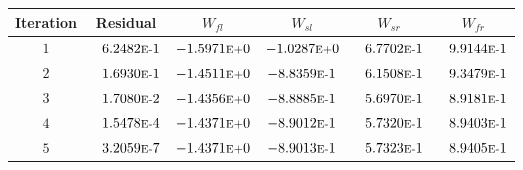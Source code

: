 \begin{tabular*}{\textwidth}{@{\extracolsep{\fill}} cccccc}
\\ 
\hline 
\hline 
Iteration & Residual & $W_{fl}$ & $W_{sl}$ & $W_{sr}$ & $W_{fr}$ \\ 
\hline 
$1$ & $\phantom{-} 6.2482\mbox{\sc{e}\smaller{-}}1$ & $-1.5971\mbox{\sc{e}\smaller{+}}0$ & $-1.0287\mbox{\sc{e}\smaller{+}}0$ & $\phantom{-} 6.7702\mbox{\sc{e}\smaller{-}}1$ & $\phantom{-} 9.9144\mbox{\sc{e}\smaller{-}}1$ \\ 
$2$ & $\phantom{-} 1.6930\mbox{\sc{e}\smaller{-}}1$ & $-1.4511\mbox{\sc{e}\smaller{+}}0$ & $-8.8359\mbox{\sc{e}\smaller{-}}1$ & $\phantom{-} 6.1508\mbox{\sc{e}\smaller{-}}1$ & $\phantom{-} 9.3479\mbox{\sc{e}\smaller{-}}1$ \\ 
$3$ & $\phantom{-} 1.7080\mbox{\sc{e}\smaller{-}}2$ & $-1.4356\mbox{\sc{e}\smaller{+}}0$ & $-8.8885\mbox{\sc{e}\smaller{-}}1$ & $\phantom{-} 5.6970\mbox{\sc{e}\smaller{-}}1$ & $\phantom{-} 8.9181\mbox{\sc{e}\smaller{-}}1$ \\ 
$4$ & $\phantom{-} 1.5478\mbox{\sc{e}\smaller{-}}4$ & $-1.4371\mbox{\sc{e}\smaller{+}}0$ & $-8.9012\mbox{\sc{e}\smaller{-}}1$ & $\phantom{-} 5.7320\mbox{\sc{e}\smaller{-}}1$ & $\phantom{-} 8.9403\mbox{\sc{e}\smaller{-}}1$ \\ 
$5$ & $\phantom{-} 3.2059\mbox{\sc{e}\smaller{-}}7$ & $-1.4371\mbox{\sc{e}\smaller{+}}0$ & $-8.9013\mbox{\sc{e}\smaller{-}}1$ & $\phantom{-} 5.7323\mbox{\sc{e}\smaller{-}}1$ & $\phantom{-} 8.9405\mbox{\sc{e}\smaller{-}}1$ \\ 
\hline 
\end{tabular*} 
